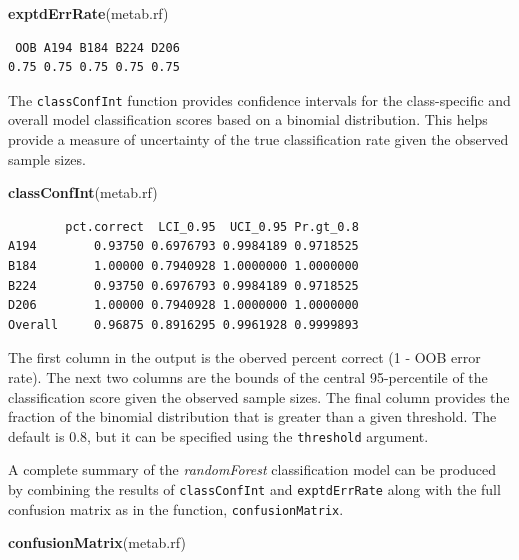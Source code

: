 \documentclass[]{article}
\newenvironment{Shaded}{\begin{snugshade}}{\end{snugshade}}
\newcommand{\KeywordTok}[1]{\textcolor[rgb]{0.13,0.29,0.53}{\textbf{{#1}}}}
\newcommand{\NormalTok}[1]{{#1}}
\begin{document}
\begin{Shaded}
\begin{Highlighting}[]
\KeywordTok{exptdErrRate}\NormalTok{(metab.rf)}
\end{Highlighting}
\end{Shaded}

\begin{verbatim}
 OOB A194 B184 B224 D206 
0.75 0.75 0.75 0.75 0.75 
\end{verbatim}

The \texttt{classConfInt} function provides confidence intervals for the
class-specific and overall model classification scores based on a
binomial distribution. This helps provide a measure of uncertainty of
the true classification rate given the observed sample sizes.

\begin{Shaded}
\begin{Highlighting}[]
\KeywordTok{classConfInt}\NormalTok{(metab.rf)}
\end{Highlighting}
\end{Shaded}

\begin{verbatim}
        pct.correct  LCI_0.95  UCI_0.95 Pr.gt_0.8
A194        0.93750 0.6976793 0.9984189 0.9718525
B184        1.00000 0.7940928 1.0000000 1.0000000
B224        0.93750 0.6976793 0.9984189 0.9718525
D206        1.00000 0.7940928 1.0000000 1.0000000
Overall     0.96875 0.8916295 0.9961928 0.9999893
\end{verbatim}

The first column in the output is the oberved percent correct (1 - OOB
error rate). The next two columns are the bounds of the central
95-percentile of the classification score given the observed sample
sizes. The final column provides the fraction of the binomial
distribution that is greater than a given threshold. The default is 0.8,
but it can be specified using the \texttt{threshold} argument.

A complete summary of the \emph{randomForest} classification model can
be produced by combining the results of \texttt{classConfInt} and
\texttt{exptdErrRate} along with the full confusion matrix as in the
function, \texttt{confusionMatrix}.

\begin{Shaded}
\begin{Highlighting}[]
\KeywordTok{confusionMatrix}\NormalTok{(metab.rf)}
\end{Highlighting}
\end{Shaded}
\end{document}

